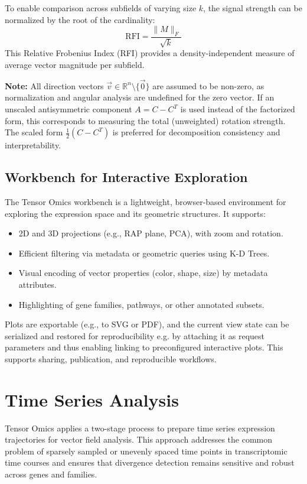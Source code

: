 \documentclass{article}
\begin{document}
To enable comparison across subfields of varying size \( k \), the signal strength can be normalized by the root of the cardinality:
\[
\text{RFI} = \frac{\|M\|_F}{\sqrt{k}}
\]
This Relative Frobenius Index (RFI) provides a density-independent measure of average vector magnitude per subfield.

\textbf{Note:} All direction vectors \( \vec{v} \in \mathbb{R}^n \setminus \{ \vec{0} \} \) are assumed to be non-zero, as normalization and angular analysis are undefined for the zero vector. If an unscaled antisymmetric component \( A = C - C^T \) is used instead of the factorized form, this corresponds to measuring the total (unweighted) rotation strength. The scaled form \(\frac{1}{2}(C - C^T)\) is preferred for decomposition consistency and interpretability.

\subsection{Workbench for Interactive Exploration}
\label{sec:workbench}

The Tensor Omics workbench is a lightweight, browser-based environment for exploring the expression space and its geometric structures. It supports:

\begin{itemize}
    \item 2D and 3D projections (e.g., RAP plane, PCA), with zoom and rotation.
    \item Efficient filtering via metadata or geometric queries using K-D Trees.
    \item Visual encoding of vector properties (color, shape, size) by metadata attributes.
    \item Highlighting of gene families, pathways, or other annotated subsets.
\end{itemize}

Plots are exportable (e.g., to SVG or PDF), and the current view state can be
serialized and restored for reproducibility e.g. by attaching it as request
parameters and thus enabling linking to preconfigured interactive plots. This
supports sharing, publication, and reproducible workflows.

\section{Time Series Analysis}
\label{sec:time_series_smoothing}

Tensor Omics applies a two-stage process to prepare time series expression trajectories for vector field analysis. This approach addresses the common problem of sparsely sampled or unevenly spaced time points in transcriptomic time courses and ensures that divergence detection remains sensitive and robust across genes and families.
\end{document}
